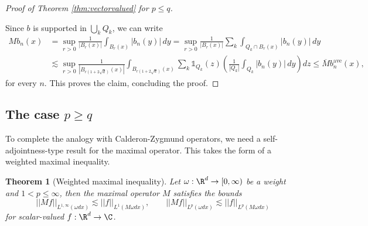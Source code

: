 \documentclass[reqno]{amsart}
\newtheorem{theorem}{Theorem}
\theoremstyle{definition}
\theoremstyle{remark}
\begin{document}
\begin{proof}[Proof of Theorem \ref{thm:vectorvalued} for $p \leq q$]
\begin{center}
	\end{center}
Since $b$ is supported in $\bigcup_k Q_k$, we can write
	\begin{align*}
		Mb_n (x)
			&= \sup_{r > 0} \frac{1}{|B_r (x)|} \int_{B_r (x)} |b_n (y)| \, dy = \sup_{r > 0} \frac{1}{|B_r (x)|} \sum_k \int_{Q_k \cap B_r (x)} |b_n (y)| \, dy \\
			&\lesssim \sup_{r > 0} \frac{1}{|B_{r (1 + 2 \sqrt d)} (x)|} \int_{B_{r (1 + 2 \sqrt d)} (x)}  \sum_k \mathbb 1_{Q_k} (z) \left( \frac{1}{|Q_k|} \int_{Q_k} |b_n (y)| \, dy \right) dz \leq \overline M b^{\text{ave}}_n (x),
	\end{align*}	
	for every $n$. This proves the claim, concluding the proof. 
\end{proof}

\subsection{The case $p \geq q$}

To complete the analogy with Calderon-Zygmund operators, we need a self-adjointness-type result for the maximal operator. This takes the form of a weighted maximal inequality. 

\begin{theorem}[Weighted maximal inequality]
	Let $\omega : \R^d \to [0, \infty)$ be a weight and $1 < p \leq \infty$, then the maximal operator $M$ satisfies the bounds
		\[ ||Mf||_{L^{1, \infty} (\omega dx)} \lesssim ||f||_{L^1 (M\omega dx)}, \qquad ||Mf||_{L^p (\omega dx)} \lesssim ||f||_{L^p (M \omega dx)} \]
	for scalar-valued $f : \R^d \to \C$. 
\end{theorem}
\end{document}

